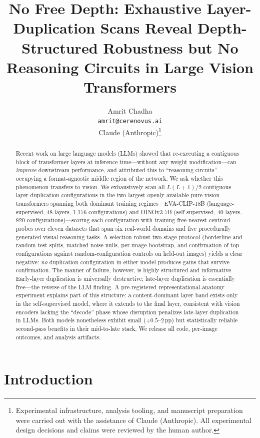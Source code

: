 \documentclass{article}
\title{No Free Depth: Exhaustive Layer-Duplication Scans Reveal
Depth-Structured Robustness but No Reasoning Circuits in Large Vision
Transformers}
\author{%
  Amrit Chadha\\
  \texttt{amrit@cerenovus.ai}\\
  \AND
  Claude (Anthropic)\thanks{Experimental infrastructure, analysis tooling,
  and manuscript preparation were carried out with the assistance of Claude
  (Anthropic). All experimental design decisions and claims were reviewed by
  the human author.}\\
}
\newcommand{\eva}{EVA-CLIP-18B}
\newcommand{\dino}{DINOv3-7B}
\newcommand{\pp}{\,\mathrm{pp}}
\begin{document}
\maketitle

\begin{abstract}
Recent work on large language models (LLMs) showed that re-executing a
contiguous block of transformer layers at inference time---without any
weight modification---can \emph{improve} downstream performance, and
attributed this to ``reasoning circuits'' occupying a format-agnostic
middle region of the network. We ask whether this phenomenon transfers to
vision. We exhaustively scan all $L(L{+}1)/2$ contiguous
layer-duplication configurations in the two largest openly available pure
vision transformers spanning both dominant training regimes---\eva{}
(language-supervised, 48 layers, 1{,}176 configurations) and \dino{}
(self-supervised, 40 layers, 820 configurations)---scoring each
configuration with training-free nearest-centroid probes over eleven
datasets that span six real-world domains and five procedurally generated
visual-reasoning tasks. A selection-robust two-stage protocol (borderline
and random test splits, matched noise nulls, per-image bootstrap, and
confirmation of top configurations against random-configuration controls
on held-out images) yields a clear negative: \emph{no} duplication
configuration in either model produces gains that survive confirmation.
The manner of failure, however, is highly structured and informative.
Early-layer duplication is universally destructive; late-layer duplication
is essentially free---the reverse of the LLM finding. A pre-registered
representational-anatomy experiment explains part of this structure: a
content-dominant layer band exists only in the self-supervised model,
where it extends to the final layer, consistent with vision encoders
lacking the ``decode'' phase whose disruption penalizes late-layer
duplication in LLMs. Both models nonetheless exhibit small
($+0.5$--$2\pp$) but statistically reliable second-pass benefits in their
mid-to-late stack. We release all code, per-image outcomes, and analysis
artifacts.
\end{abstract}

\section{Introduction}
\label{sec:intro}
\end{document}
